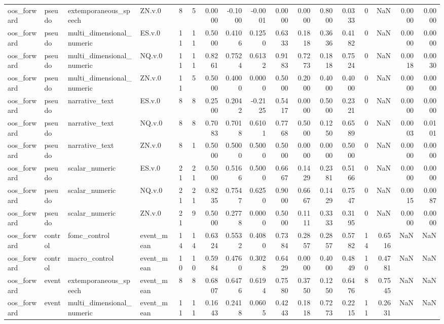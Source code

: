 \begin{tabular}{llllrrrrrrrrrrrrr}
oos_forward & pseudo & extemporaneous_speech & ZN.v.0 & 8 & 5 & 0.0000 & -0.1000 & -0.0001 & 0.0000 & 0.0000 & 0.8000 & 0.0333 & 0 & NaN & 0.0000 & 0.0000 \\
oos_forward & pseudo & multi_dimensional_numeric & ES.v.0 & 11 & 11 & 0.5000 & 0.4106 & 0.1250 & 0.6333 & 0.1818 & 0.3636 & 0.4182 & 0 & NaN & 0.0000 & 0.0000 \\
oos_forward & pseudo & multi_dimensional_numeric & NQ.v.0 & 11 & 11 & 0.8261 & 0.7524 & 0.6132 & 0.9183 & 0.7273 & 0.1818 & 0.7524 & 0 & NaN & 0.0018 & 0.0030 \\
oos_forward & pseudo & multi_dimensional_numeric & ZN.v.0 & 11 & 5 & 0.5000 & 0.4000 & 0.0000 & 0.5000 & 0.2000 & 0.4000 & 0.4000 & 0 & NaN & 0.0000 & 0.0000 \\
oos_forward & pseudo & narrative_text & ES.v.0 & 8 & 8 & 0.2500 & 0.2042 & -0.2125 & 0.5417 & 0.0000 & 0.5000 & 0.2321 & 0 & NaN & 0.0000 & 0.0000 \\
oos_forward & pseudo & narrative_text & NQ.v.0 & 8 & 8 & 0.7083 & 0.7018 & 0.6101 & 0.7768 & 0.5000 & 0.1250 & 0.6589 & 0 & NaN & 0.0003 & 0.0101 \\
oos_forward & pseudo & narrative_text & ZN.v.0 & 8 & 1 & 0.5000 & 0.5000 & 0.5000 & 0.5000 & 0.0000 & 0.0000 & 0.5000 & 0 & NaN & 0.0000 & 0.0000 \\
oos_forward & pseudo & scalar_numeric & ES.v.0 & 21 & 21 & 0.5000 & 0.5166 & 0.5000 & 0.6667 & 0.1429 & 0.2381 & 0.5166 & 0 & NaN & 0.0000 & 0.0000 \\
oos_forward & pseudo & scalar_numeric & NQ.v.0 & 21 & 21 & 0.8235 & 0.7547 & 0.6250 & 0.9000 & 0.6667 & 0.1429 & 0.7547 & 0 & NaN & 0.0015 & 0.0087 \\
oos_forward & pseudo & scalar_numeric & ZN.v.0 & 21 & 9 & 0.5000 & 0.2778 & 0.0000 & 0.5000 & 0.1111 & 0.3333 & 0.3195 & 0 & NaN & 0.0000 & 0.0000 \\
oos_forward & control & fomc_control & event_mean & 14 & 14 & 0.6324 & 0.5532 & 0.4080 & 0.7384 & 0.2857 & 0.2857 & 0.5782 & 14 & 0.6516 & NaN & NaN \\
oos_forward & control & macro_control & event_mean & 10 & 10 & 0.5984 & 0.4760 & 0.3028 & 0.6429 & 0.0000 & 0.4000 & 0.4849 & 10 & 0.4781 & NaN & NaN \\
oos_forward & event & extemporaneous_speech & event_mean & 8 & 8 & 0.6807 & 0.6476 & 0.6194 & 0.7580 & 0.3750 & 0.1250 & 0.6476 & 8 & 0.7545 & NaN & NaN \\
oos_forward & event & multi_dimensional_numeric & event_mean & 11 & 11 & 0.1643 & 0.2418 & 0.0605 & 0.4243 & 0.1818 & 0.7273 & 0.2215 & 11 & 0.2631 & NaN & NaN \\

\end{tabular}
